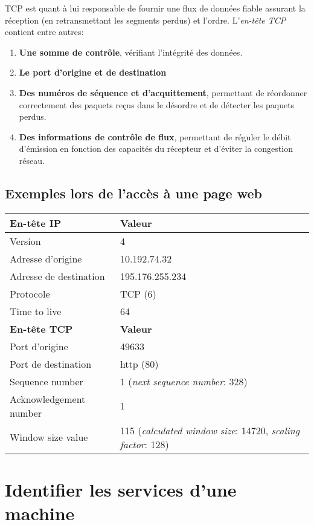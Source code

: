 \documentclass[11pt,a4paper]{article}
\begin{document}
TCP est quant à lui responsable de fournir une flux de données fiable assurant la réception (en retransmettant les segments perdus) et l'ordre. L'\textit{en-tête TCP} contient entre autres:

\begin{enumerate}
	\item \textbf{Une somme de contrôle}, vérifiant l'intégrité des données.
	\item \textbf{Le port d'origine et de destination}
	\item \textbf{Des numéros de séquence et d'acquittement}, permettant de réordonner correctement des paquets reçus dans le désordre et de détecter les paquets perdus.
	\item \textbf{Des informations de contrôle de flux}, permettant de réguler le débit d'émission en fonction des capacités du récepteur et d'éviter la congestion réseau.
\end{enumerate}

\subsection{Exemples lors de l'accès à une page web}

\begin{tabular}{|l|p{10.3cm}|}
	\hline
	\textbf{En-tête IP} & \textbf{Valeur} \\
	\hline
	Version & 4 \\
	Adresse d'origine & 10.192.74.32 \\
	Adresse de destination & 195.176.255.234 \\
	Protocole & TCP (6) \\
	Time to live & 64 \\
	\hline
	\hline
	\textbf{En-tête TCP} & \textbf{Valeur} \\
	\hline
	Port d'origine & 49633 \\
	Port de destination & http (80) \\
	Sequence number & 1 (\textit{next sequence number}: 328) \\
	Acknowledgement number & 1 \\
	Window size value & 115 (\textit{calculated window size}: 14720, \textit{scaling factor}: 128) \\
	\hline
\end{tabular}

\section{Identifier les services d'une machine}
\end{document}
